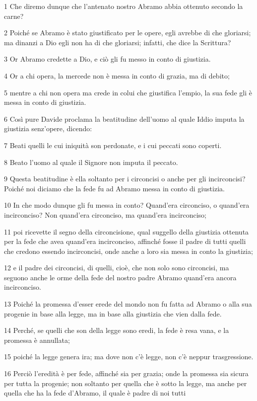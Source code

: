 \par 1 Che diremo dunque che l'antenato nostro Abramo abbia ottenuto secondo la carne?
\par 2 Poiché se Abramo è stato giustificato per le opere, egli avrebbe di che gloriarsi; ma dinanzi a Dio egli non ha di che gloriarsi; infatti, che dice la Scrittura?
\par 3 Or Abramo credette a Dio, e ciò gli fu messo in conto di giustizia.
\par 4 Or a chi opera, la mercede non è messa in conto di grazia, ma di debito;
\par 5 mentre a chi non opera ma crede in colui che giustifica l'empio, la sua fede gli è messa in conto di giustizia.
\par 6 Così pure Davide proclama la beatitudine dell'uomo al quale Iddio imputa la giustizia senz'opere, dicendo:
\par 7 Beati quelli le cui iniquità son perdonate, e i cui peccati sono coperti.
\par 8 Beato l'uomo al quale il Signore non imputa il peccato.
\par 9 Questa beatitudine è ella soltanto per i circoncisi o anche per gli incirconcisi? Poiché noi diciamo che la fede fu ad Abramo messa in conto di giustizia.
\par 10 In che modo dunque gli fu messa in conto? Quand'era circonciso, o quand'era incirconciso? Non quand'era circonciso, ma quand'era incirconciso;
\par 11 poi ricevette il segno della circoncisione, qual suggello della giustizia ottenuta per la fede che avea quand'era incirconciso, affinché fosse il padre di tutti quelli che credono essendo incirconcisi, onde anche a loro sia messa in conto la giustizia;
\par 12 e il padre dei circoncisi, di quelli, cioè, che non solo sono circoncisi, ma seguono anche le orme della fede del nostro padre Abramo quand'era ancora incirconciso.
\par 13 Poiché la promessa d'esser erede del mondo non fu fatta ad Abramo o alla sua progenie in base alla legge, ma in base alla giustizia che vien dalla fede.
\par 14 Perché, se quelli che son della legge sono eredi, la fede è resa vana, e la promessa è annullata;
\par 15 poiché la legge genera ira; ma dove non c'è legge, non c'è neppur trasgressione.
\par 16 Perciò l'eredità è per fede, affinché sia per grazia; onde la promessa sia sicura per tutta la progenie; non soltanto per quella che è sotto la legge, ma anche per quella che ha la fede d'Abramo, il quale è padre di noi tutti

